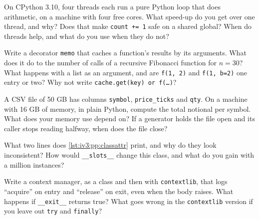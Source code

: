 \begin{question}\label{iq:iv3:python-and-pandas:10}
On CPython 3.10, four threads each run a pure Python loop that does arithmetic, on a machine with four free cores. What speed-up do you get over one thread, and why? Does that make \texttt{count += 1} safe on a shared global? When do threads help, and what do you use when they do not?
\end{question}

\begin{question}\label{iq:iv3:python-and-pandas:11}
Write a decorator \texttt{memo} that caches a function's results by its arguments. What does it do to the number of calls of a recursive Fibonacci function for $n = 30$? What happens with a list as an argument, and are \texttt{f(1, 2)} and \texttt{f(1, b=2)} one entry or two? Why not write \texttt{cache.get(key) or f(\dots)}?
\end{question}

\begin{question}\label{iq:iv3:python-and-pandas:12}
A CSV file of 50 GB has columns \texttt{symbol}, \texttt{price\_ticks} and \texttt{qty}. On a machine with 16 GB of memory, in plain Python, compute the total notional per symbol. What does your memory use depend on? If a generator holds the file open and its caller stops reading halfway, when does the file close?
\end{question}

\begin{question}\label{iq:iv3:python-and-pandas:13}
What two lines does \cref{lst:iv3:pp:classattr} print, and why do they look inconsistent? How would \texttt{\_\_slots\_\_} change this class, and what do you gain with a million instances?
\label{lst:iv3:pp:classattr}
\end{question}

\begin{question}\label{iq:iv3:python-and-pandas:14}
Write a context manager, as a class and then with \texttt{contextlib}, that logs ``acquire'' on entry and ``release'' on exit, even when the body raises. What happens if \texttt{\_\_exit\_\_} returns true? What goes wrong in the \texttt{contextlib} version if you leave out \texttt{try} and \texttt{finally}?
\end{question}

